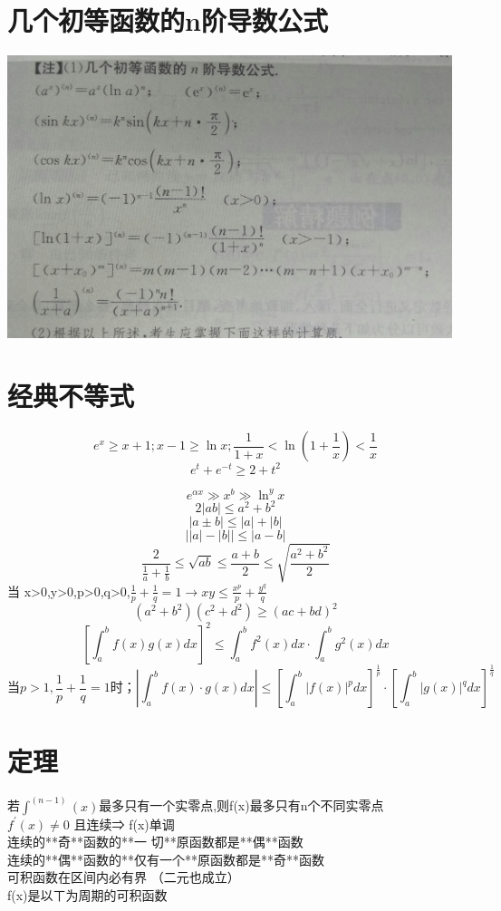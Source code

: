 \documentclass[UTF8]{ctexart}
\begin{document}
\section{几个初等函数的n阶导数公式}
\includegraphics[width=13cm]{9345E7/2A793F093B002F668B144F9ED087EB77.jpg}



\section{经典不等式}
$$e^x \geq x+1 ; x-1 \geq \ln x ; \frac{1}{1+x} < \ln \left( 1+ \frac{1}{x} \right) < \frac{1}{x}$$
$$ e^t + e^{-t} \geq 2+t^2 $$

$$ e^{αx} \gg x^b \gg \ln^y x $$
$$ 2\left| ab \right| \leq a^2+b^2$$
$$ \left| a \pm b \right| \leq |a|+|b|$$
$$ \left| |a| - |b| \right| \leq |a-b|$$
$$\frac{2}{\frac{1}{a} + \frac{1}{b}} \leq
\sqrt{ab} \leq \frac{a+b}{2} \leq \sqrt{\frac{a^2+b^2}{2}}$$
当 x>0,y>0,p>0,q>0,$\frac{1}{p}+\frac{1}{q}=1 \rightarrow xy \leq \frac{x^p}{p}+\frac{y^q}{q}$
$$(a^2+b^2)(c^2+d^2) \geq (ac+bd)^2$$
$$ [\int_a^b f(x)g(x)dx]^2 \leq \int_a^b f^2(x)dx\cdot \int_a^b g^2(x)dx$$
$$\mbox{当} p>1, \frac{1}{p}+\frac{1}{q}=1 \mbox{时；} \left| \int_a^b f(x) \cdot g(x)dx\right| \leq \left[ \int_a^b \left| f(x) \right|^p dx \right] ^\frac{1}{p} \cdot \left[ \int_a^b \left| g(x) \right|^q dx \right] ^\frac{1}{q}$$

\section{定理}
​若$\int^{(n-1)}(x)$最多只有一个实零点,则f(x)最多只有n个不同实零点 \\
$f^′(x)≠0$ 且连续⇒ f(x)单调 \\
连续的**奇**函数的**一  切**原函数都是**偶**函数 \\
连续的**偶**函数的**仅有一个**原函数都是**奇**函数 \\
可积函数在区间内必有界 （二元也成立） \\
f(x)是以ㄒ为周期的可积函数 \\
\end{document}
